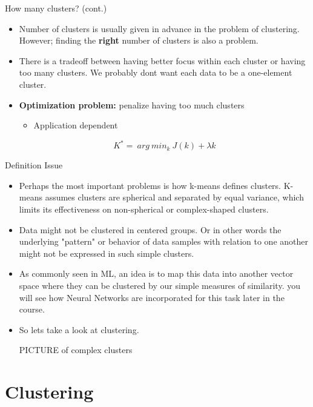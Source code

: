 \documentclass[serif, aspectratio=169]{beamer}
\begin{document}
\begin{frame}{How many clusters? (cont.)}
    \begin{itemize}
        \item Number of clusters is usually given in advance in the problem of clustering. However; finding the \textbf{right} number of clusters is also a problem.
        \item There is a tradeoff between having better focus within each cluster or having too many clusters. We probably dont want each data to be a one-element cluster.
        \item \textbf{Optimization problem:} penalize having too much clusters
        \begin{itemize}
            \item Application dependent
        \end{itemize}
        \[
        K^* = \ arg \ min_k \  J(k) + \lambda k 
        \]
    \end{itemize}
\end{frame}


\begin{frame}{Definition Issue}
    \begin{itemize}
        \item Perhaps the most important problems is how k-means defines clusters. K-means assumes clusters are spherical and separated by equal variance, which limits its effectiveness on non-spherical or complex-shaped clusters. 
        \item Data might not be clustered in centered groups. Or in other words the underlying "pattern" or behavior of data samples  with relation to one another might not be expressed in such simple clusters.
        \item As commonly seen in ML, an idea is to map this data into another vector space where they can be clustered by our simple measures of similarity. you will see how Neural Networks are incorporated for this task later in the course.
\item So lets take a look at clustering.

PICTURE of complex clusters

    \end{itemize}
\end{frame}


\section{Clustering}
\end{document}
